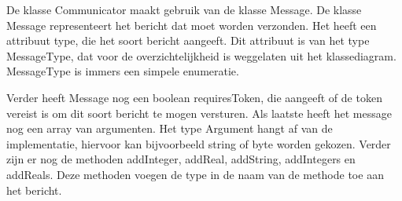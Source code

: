De klasse Communicator maakt gebruik van de klasse Message. De klasse Message representeert het bericht dat moet worden verzonden. Het heeft een attribuut type, die het soort bericht aangeeft. Dit attribuut is van het type MessageType, dat voor de overzichtelijkheid is weggelaten uit het klassediagram. MessageType is immers een simpele enumeratie.

Verder heeft Message nog een boolean requiresToken, die aangeeft of de token vereist is om dit soort bericht te mogen versturen.  Als laatste heeft het message nog een array van argumenten. Het type Argument hangt af van de implementatie, hiervoor kan bijvoorbeeld string of byte worden gekozen. Verder zijn er nog de methoden addInteger, addReal, addString, addIntegers en addReals. Deze methoden voegen de type in de naam van de methode toe aan het bericht.
